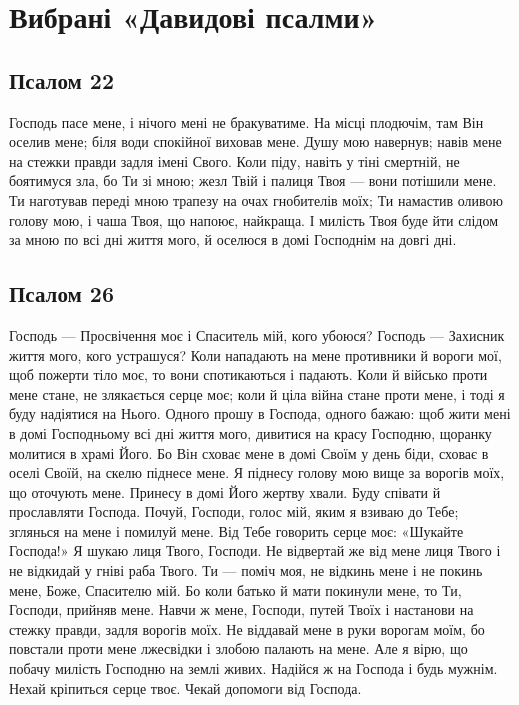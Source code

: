 \documentclass[chapters.tex]{subfiles}
\begin{document}
\chapter{Вибрані «Давидові псалми»}

\section{Псалом 22}
Господь пасе мене, і нічого мені не бракуватиме. На місці плодючім, там Він оселив мене; біля води спокійної виховав мене. Душу мою навернув; навів мене на стежки правди задля імені Свого. Коли піду, навіть у тіні смертній, не боятимуся зла, бо Ти зі мною; жезл Твій і палиця Твоя — вони потішили мене. Ти наготував переді мною трапезу на очах гнобителів моїх; Ти намастив оливою голову мою, і чаша Твоя, що напоює, найкраща. І милість Твоя буде йти слідом за мною по всі дні життя мого, й оселюся в домі Господнім на довгі дні.

\section{Псалом 26}
Господь — Просвічення моє і Спаситель мій, кого убоюся? Господь — Захисник життя мого, кого устрашуся? Коли нападають на мене противники й вороги мої, щоб пожерти тіло моє, то вони спотикаються і падають. Коли й військо проти мене стане, не злякається серце моє; коли й ціла війна стане проти мене, і тоді я буду надіятися на Нього. Одного прошу в Господа, одного бажаю: щоб жити мені в домі Господньому всі дні життя мого, дивитися на красу Господню, щоранку молитися в храмі Його. Бо Він сховає мене в домі Своїм у день біди, сховає в оселі Своїй, на скелю піднесе мене. Я піднесу голову мою вище за ворогів моїх, що оточують мене. Принесу в домі Його жертву хвали. Буду співати й прославляти Господа. Почуй, Господи, голос мій, яким я взиваю до Тебе; зглянься на мене і помилуй мене. Від Тебе говорить серце моє: «Шукайте Господа!» Я шукаю лиця Твого, Господи. Не відвертай же від мене лиця Твого і не відкидай у гніві раба Твого. Ти — поміч моя, не відкинь мене і не покинь мене, Боже, Спасителю мій. Бо коли батько й мати покинули мене, то Ти, Господи, прийняв мене. Навчи ж мене, Господи, путей Твоїх і настанови на стежку правди, задля ворогів моїх. Не віддавай мене в руки ворогам моїм, бо повстали проти мене лжесвідки і злобою палають на мене. Але я вірю, що побачу милість Господню на землі живих. Надійся ж на Господа і будь мужнім. Нехай кріпиться серце твоє. Чекай допомоги від Господа.
\end{document}
